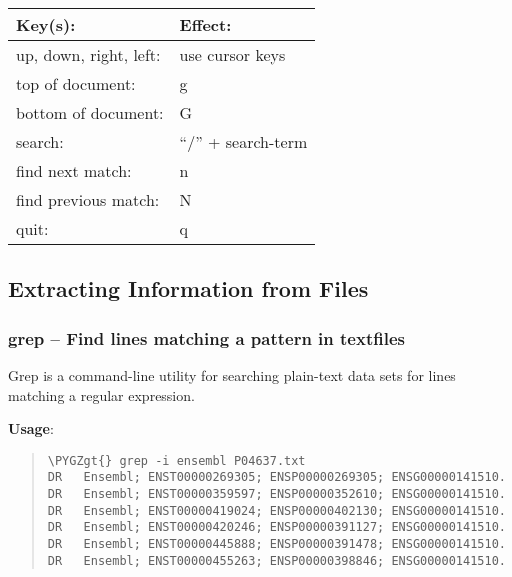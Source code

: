 \documentclass[a4paper,11pt,english]{sphinxmanual}
\def\PYGZgt{\char`\>}
\begin{document}
\begin{tabulary}{\linewidth}{|L|L|}
\hline
\textbf{
Key(s):
} & \textbf{
Effect:
}\\\hline

up, down, right, left:
 & 
use cursor keys
\\\hline

top of document:
 & 
g
\\\hline

bottom of document:
 & 
G
\\\hline

search:
 & 
“/” + search-term
\\\hline

find next match:
 & 
n
\\\hline

find previous match:
 & 
N
\\\hline

quit:
 & 
q
\\\hline
\end{tabulary}



\subsection{Extracting Information from Files}
\label{introduction:extracting-information-from-files}

\subsubsection{grep – Find lines matching a pattern in textfiles}
\label{introduction:grep-find-lines-matching-a-pattern-in-textfiles}
Grep is a command-line utility for searching plain-text data sets for lines matching a regular expression.

\textbf{Usage}:  
\begin{quote}

\begin{Verbatim}[frame=single, rulecolor=\color{lightgray}, fontfamily=courier, commandchars=\\\{\}]
\PYGZgt{} grep -i ensembl P04637.txt
DR   Ensembl; ENST00000269305; ENSP00000269305; ENSG00000141510.
DR   Ensembl; ENST00000359597; ENSP00000352610; ENSG00000141510.
DR   Ensembl; ENST00000419024; ENSP00000402130; ENSG00000141510.
DR   Ensembl; ENST00000420246; ENSP00000391127; ENSG00000141510.
DR   Ensembl; ENST00000445888; ENSP00000391478; ENSG00000141510.
DR   Ensembl; ENST00000455263; ENSP00000398846; ENSG00000141510.
\end{Verbatim}
\end{quote}
\end{document}
